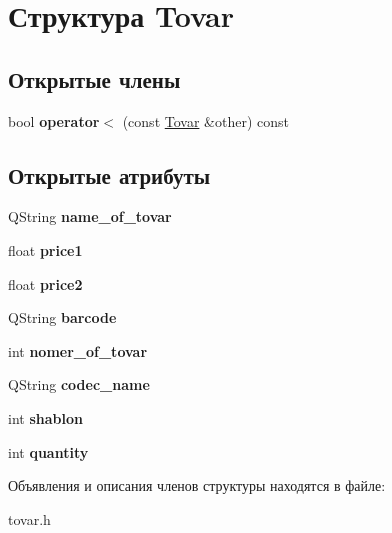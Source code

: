 \hypertarget{struct_tovar}{\section{Структура \-Tovar}
\label{struct_tovar}
}
\subsection*{Открытые члены}
\begin{DoxyCompactItemize}
\item 
\hypertarget{struct_tovar_ad566921c830e3919dda043641fc85f5e}{bool {\bfseries operator$<$} (const \hyperlink{struct_tovar}{\-Tovar} \&other) const }\label{struct_tovar_ad566921c830e3919dda043641fc85f5e}

\end{DoxyCompactItemize}
\subsection*{Открытые атрибуты}
\begin{DoxyCompactItemize}
\item 
\hypertarget{struct_tovar_a0558b5260c83faf4e7aa0e832025d590}{\-Q\-String {\bfseries name\-\_\-of\-\_\-tovar}}\label{struct_tovar_a0558b5260c83faf4e7aa0e832025d590}

\item 
\hypertarget{struct_tovar_a23aee907302c0340de9dc722444d204b}{float {\bfseries price1}}\label{struct_tovar_a23aee907302c0340de9dc722444d204b}

\item 
\hypertarget{struct_tovar_ac611856fa45875e8c1443477254c1613}{float {\bfseries price2}}\label{struct_tovar_ac611856fa45875e8c1443477254c1613}

\item 
\hypertarget{struct_tovar_add3cd7c24dc5c28062a5d4c6fe42b04b}{\-Q\-String {\bfseries barcode}}\label{struct_tovar_add3cd7c24dc5c28062a5d4c6fe42b04b}

\item 
\hypertarget{struct_tovar_a482dd26f52f0f5cf87c19a040d4ccefb}{int {\bfseries nomer\-\_\-of\-\_\-tovar}}\label{struct_tovar_a482dd26f52f0f5cf87c19a040d4ccefb}

\item 
\hypertarget{struct_tovar_a0c6ccedf9c913bee32443e26de7a19c3}{\-Q\-String {\bfseries codec\-\_\-name}}\label{struct_tovar_a0c6ccedf9c913bee32443e26de7a19c3}

\item 
\hypertarget{struct_tovar_a2b61d47e68345a4ceb2ff00e6c03bc5a}{int {\bfseries shablon}}\label{struct_tovar_a2b61d47e68345a4ceb2ff00e6c03bc5a}

\item 
\hypertarget{struct_tovar_aed46d41d507daa3662368e50c87e046c}{int {\bfseries quantity}}\label{struct_tovar_aed46d41d507daa3662368e50c87e046c}

\end{DoxyCompactItemize}


Объявления и описания членов структуры находятся в файле\-:\begin{DoxyCompactItemize}
\item 
tovar.\-h\end{DoxyCompactItemize}
